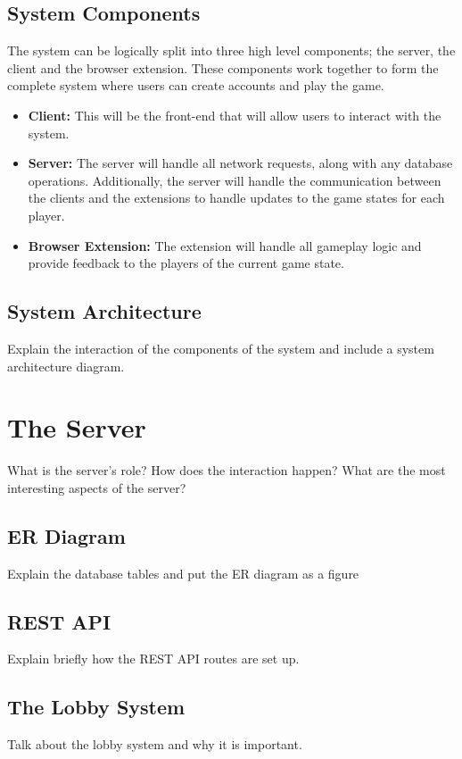 \documentclass{l4proj}
\begin{document}
\subsection{System Components}
The system can be logically split into three high level components; the server, the client and the browser extension. These components work together to form the complete system where users can create accounts and play the game.
\begin{itemize}
    \item
    \textbf{Client:} This will be the front-end that will allow users to interact with the system.
    \item
    \textbf{Server:} The server will handle all network requests, along with any database operations. Additionally, the server will handle the communication between the clients and the extensions to handle updates to the game states for each player.
    \item
    \textbf{Browser Extension:} The extension will handle all gameplay logic and provide feedback to the players of the current game state. 
\end{itemize}


\subsection{System Architecture}
Explain the interaction of the components of the system and include a system architecture diagram.

\section{The Server}
What is the server's role? How does the interaction happen? What are the most interesting aspects of the server?

\subsection{ER Diagram}
Explain the database tables and put the ER diagram as a figure

\subsection{REST API}
Explain briefly how the REST API routes are set up.

\subsection{The Lobby System}
Talk about the lobby system and why it is important.
\end{document}
